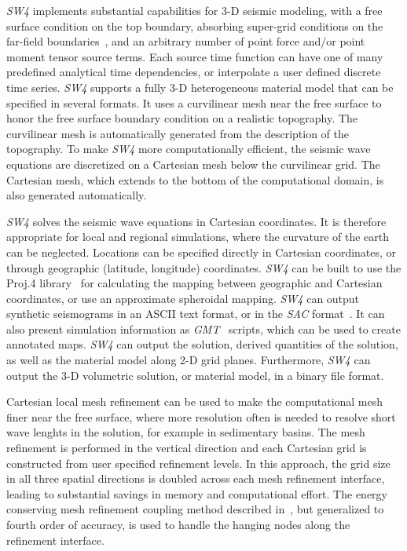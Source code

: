 \documentclass[11pt]{report}
\begin{document}
\emph{SW4} implements substantial capabilities for 3-D seismic modeling, with a free surface
condition on the top boundary, absorbing super-grid conditions on the far-field
boundaries~\cite{PetSjo-14}, and an arbitrary number of point force and/or point moment tensor
source terms. Each source time function can have one of many predefined analytical time
dependencies, or interpolate a user defined discrete time series. \emph{SW4} supports a fully 3-D
heterogeneous material model that can be specified in several formats. It uses a curvilinear mesh
near the free surface to honor the free surface boundary condition on a realistic topography. The
curvilinear mesh is automatically generated from the description of the topography. To make
\emph{SW4} more computationally efficient, the seismic wave equations are discretized on a Cartesian
mesh below the curvilinear grid. The Cartesian mesh, which extends to the bottom of the
computational domain, is also generated automatically.

\emph{SW4} solves the seismic wave equations in Cartesian coordinates. It is therefore appropriate
for local and regional simulations, where the curvature of the earth can be neglected. Locations can
be specified directly in Cartesian coordinates, or through geographic (latitude, longitude)
coordinates. \emph{SW4} can be built to use the Proj.4 library~\cite{Proj4} for calculating the
mapping between geographic and Cartesian coordinates, or use an approximate spheroidal
mapping. \emph{SW4} can output synthetic seismograms in an ASCII text format, or in the \emph{SAC}
format~\cite{Goldstein-et-al}. It can also present simulation information as
\emph{GMT}~\cite{WesselSmithGMT} scripts, which can be used to create annotated maps. \emph{SW4} can
output the solution, derived quantities of the solution, as well as the material model along 2-D
grid planes. Furthermore, \emph{SW4} can output the 3-D volumetric solution, or material model, in a
binary file format.

Cartesian local mesh refinement can be used to make the computational
mesh finer near the free surface, where more resolution often is needed to resolve short wave
lenghts in the solution, for example in sedimentary basins. The mesh refinement is performed in the
vertical direction and each Cartesian grid is constructed from user specified refinement levels. In
this approach, the grid size in all three spatial directions is doubled across each mesh refinement
interface, leading to substantial savings in memory and computational effort. The energy conserving
mesh refinement coupling method described in~\cite{PetSjo-10}, but generalized to fourth order of
accuracy, is used to handle the hanging nodes along the refinement interface.
\end{document}
